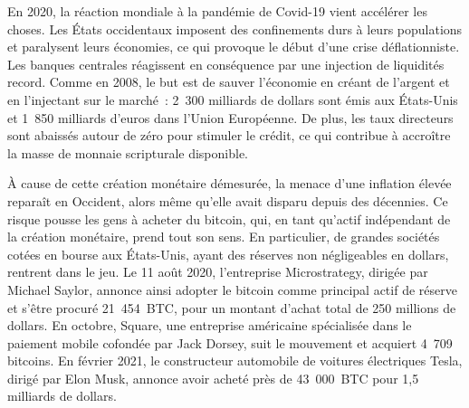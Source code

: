 En 2020, la réaction mondiale à la pandémie de Covid-19 vient accélérer les choses. Les États occidentaux imposent des confinements durs à leurs populations et paralysent leurs économies, ce qui provoque le début d'une crise déflationniste. Les banques centrales réagissent en conséquence par une injection de liquidités record. Comme en 2008, le but est de sauver l'économie en créant de l'argent et en l'injectant sur le marché~: 2~300 milliards de dollars sont émis aux États-Unis et 1~850 milliards d'euros dans l'Union Européenne. De plus, les taux directeurs sont abaissés autour de zéro pour stimuler le crédit, ce qui contribue à accroître la masse de monnaie scripturale disponible.

À cause de cette création monétaire démesurée, la menace d'une inflation élevée reparaît en Occident, alors même qu'elle avait disparu depuis des décennies. Ce risque pousse les gens à acheter du bitcoin, qui, en tant qu'actif indépendant de la création monétaire, prend tout son sens. En particulier, de grandes sociétés cotées en bourse aux États-Unis, ayant des réserves non négligeables en dollars, rentrent dans le jeu. Le 11 août 2020, l'entreprise Microstrategy, dirigée par Michael Saylor, annonce ainsi adopter le bitcoin comme principal actif de réserve et s'être procuré 21~454~BTC, pour un montant d'achat total de 250 millions de dollars. En octobre, Square, une entreprise américaine spécialisée dans le paiement mobile cofondée par Jack Dorsey, suit le mouvement et acquiert 4~709 bitcoins. En février 2021, le constructeur automobile de voitures électriques Tesla, dirigé par Elon Musk, annonce avoir acheté près de 43~000~BTC pour 1,5 milliards de dollars.

